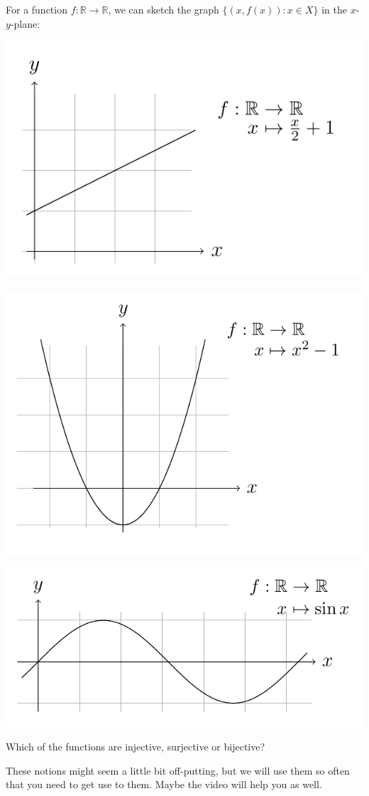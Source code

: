 \begin{example}
For a function $f:\mathbb{R}\rightarrow\mathbb{R}$, we can sketch the graph $\lbrace(x,f(x)): x\in X\rbrace$ in the $x$-$y$-plane:

\includegraphics{./examp1.png}

\includegraphics{./examp2.png}

\includegraphics{./examp3.png}

Which of the functions are injective, surjective or bijective?
\end{example}

These notions might seem a little bit off-putting, but we will use them so often that you need to get use to them. Maybe the video will help you as well.
